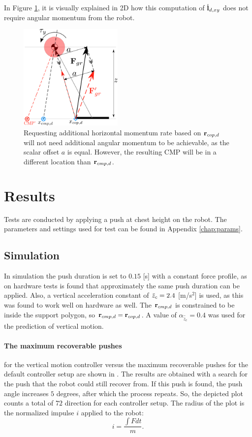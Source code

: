 In Figure \ref{fig:rcopdvsrcmpd}, it is visually explained in \ac{2D} how this computation of $\dot{\mathbf{l}}_{d,xy}$ does not require angular momentum from the robot.

\begin{figure}[h]
\centering
\includegraphics[width=0.45\textwidth]{STYLESTUFF/2DControlStrategyViz.png}
\caption{Requesting additional horizontal momentum rate based on $\mathbf{r}_{cop,d}$ will not need additional angular momentum to be achievable, as the scalar offset $a$ is equal. However, the resulting \ac{CMP} will be in a different location than $\mathbf{r}_{cmp,d}$.}
\label{fig:rcopdvsrcmpd}
\end{figure}

\section{Results}
Tests are conducted by applying a push at chest height on the robot. The parameters and settings used for test can be found in Appendix \ref{chap:params}.
\subsection{Simulation}
In simulation the push duration is set to $0.15$ [s] with a constant force profile, as on hardware tests is found that approximately the same push duration can be applied. Also, a vertical acceleration constant of $\ddot{z}_{c}=2.4$ [m/s$^2$] is used, as this was found to work well on hardware as well. The $\mathbf{r}_{cmp,d}$ is constrained to be inside the support polygon, so $\mathbf{r}_{cmp,d}=\mathbf{r}_{cop,d}$. A value of $\alpha_{\hat{\ddot{z}}_{c}}=0.4$ was used for the prediction of vertical motion.

\paragraph{The maximum recoverable pushes} for the vertical motion controller versus the maximum recoverable pushes for the default controller setup are shown in . The results are obtained with a search for the push that the robot could still recover from. If this push is found, the push angle increases $5$ degrees, after which the process repeats. So, the depicted plot counts a total of $72$ direction for each controller setup. The radius of the plot is the normalized impulse $i$ applied to the robot:
\begin{equation}
	i = \frac{\int F dt}{m}.
\end{equation}


